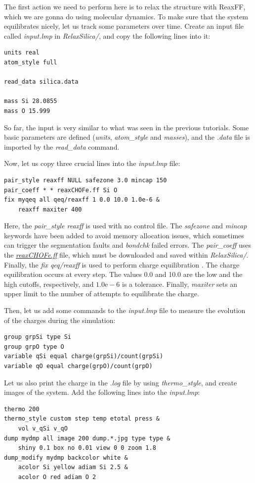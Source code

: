 \documentclass[9pt,tutorial]{livecoms}
\begin{document}
The first action we need to perform here is to relax the structure with ReaxFF,
which we are gonna do using molecular dynamics. To make sure that the system
equilibrates nicely, let us track some parameters over time. Create an input
file called \textit{input.lmp} in \textit{RelaxSilica/}, and copy the following
lines into it:
\begin{lstlisting}
units real
atom_style full

read_data silica.data

mass Si 28.0855
mass O 15.999
\end{lstlisting}
So far, the input is very similar to what was seen in the previous tutorials.
Some basic parameters are defined (\textit{units}, \textit{atom\_style} and \textit{masses}),
and the \textit{.data} file is imported by the \textit{read\_data} command.

Now, let us copy three crucial lines into the \textit{input.lmp} file:
\begin{lstlisting}
pair_style reaxff NULL safezone 3.0 mincap 150
pair_coeff * * reaxCHOFe.ff Si O
fix myqeq all qeq/reaxff 1 0.0 10.0 1.0e-6 &
    reaxff maxiter 400
\end{lstlisting}
Here, the \textit{pair\_style reaxff} is used with no control file. The
\textit{safezone} and \textit{mincap} keywords have been added to avoid memory
allocation issues, which sometimes can trigger the segmentation faults and
\textit{bondchk} failed errors. The \textit{pair\_coeff} uses the
\href{https://raw.githubusercontent.com/lammpstutorials/lammpstutorials-article/main/files/tutorial5/reaxCHOFe.ff}{\textit{reaxCHOFe.ff}}
file, which must be downloaded and saved within \textit{RelaxSilica/}. Finally, the
\textit{fix qeq/reaxff} is used to perform charge equilibration \cite{rappe1991charge}.
The charge equilibration occurs at every step. The values 0.0 and 10.0 are the
low and the high cutoffs, respectively, and $1.0 \text{e} -6$ is a tolerance.
Finally, \textit{maxiter} sets an upper limit to the number of attempts to
equilibrate the charge.

Then, let us add some commands to the \textit{input.lmp} file  to measure the
evolution of the charges during the simulation:
\begin{lstlisting}
group grpSi type Si
group grpO type O
variable qSi equal charge(grpSi)/count(grpSi)
variable qO equal charge(grpO)/count(grpO)
\end{lstlisting}
Let us also print the charge in the \textit{.log} file by using \textit{thermo\_style},
and create images of the system. Add the following lines into the \textit{input.lmp}:
\begin{lstlisting}
thermo 200
thermo_style custom step temp etotal press &
    vol v_qSi v_qO
dump mydmp all image 200 dump.*.jpg type type &
    shiny 0.1 box no 0.01 view 0 0 zoom 1.8
dump_modify mydmp backcolor white &
    acolor Si yellow adiam Si 2.5 &
    acolor O red adiam O 2
\end{lstlisting}
\end{document}
